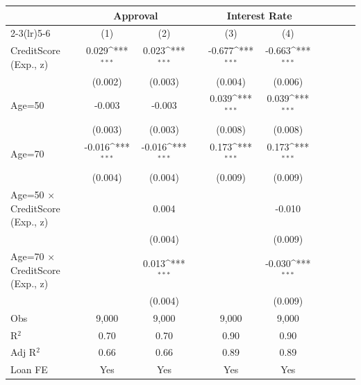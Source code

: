 { \def\sym#1{\ifmmode^{#1}\else\(^{#1}\)\fi}
\begin{tabular}{l*{9}{c}} \toprule
                &\multicolumn{2}{c}{Approval}         &         &\multicolumn{2}{c}{Interest Rate}    \\\cmidrule(lr){2-3}\cmidrule(lr){5-6}
                &\multicolumn{1}{c}{(1)}         &\multicolumn{1}{c}{(2)}         &         &\multicolumn{1}{c}{(3)}         &\multicolumn{1}{c}{(4)}         \\
\midrule
CreditScore (Exp., z)&    0.029\sym{***}&    0.023\sym{***}&         &   -0.677\sym{***}&   -0.663\sym{***}\\
                &  (0.002)         &  (0.003)         &         &  (0.004)         &  (0.006)         \\
Age=50          &   -0.003         &   -0.003         &         &    0.039\sym{***}&    0.039\sym{***}\\
                &  (0.003)         &  (0.003)         &         &  (0.008)         &  (0.008)         \\
Age=70          &   -0.016\sym{***}&   -0.016\sym{***}&         &    0.173\sym{***}&    0.173\sym{***}\\
                &  (0.004)         &  (0.004)         &         &  (0.009)         &  (0.009)         \\
Age=50 $\times$ CreditScore (Exp., z)&                  &    0.004         &         &                  &   -0.010         \\
                &                  &  (0.004)         &         &                  &  (0.009)         \\
Age=70 $\times$ CreditScore (Exp., z)&                  &    0.013\sym{***}&         &                  &   -0.030\sym{***}\\
                &                  &  (0.004)         &         &                  &  (0.009)         \\
\midrule
Obs             &    9,000         &    9,000         &         &    9,000         &    9,000         \\
R$^2$           &     0.70         &     0.70         &         &     0.90         &     0.90         \\
Adj R$^2$       &     0.66         &     0.66         &         &     0.89         &     0.89         \\
Loan FE         &      Yes         &      Yes         &         &      Yes         &      Yes         \\
\bottomrule
\end{tabular}
}
